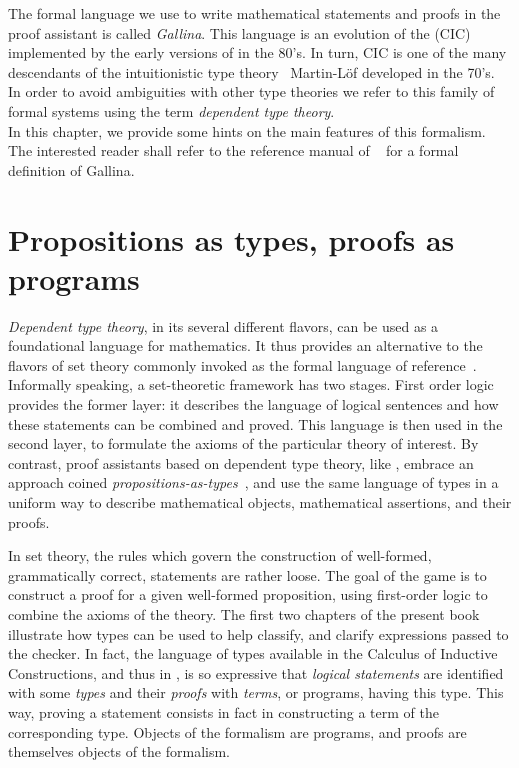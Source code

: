 The formal language we use to write
mathematical statements and proofs in the \Coq{} proof assistant
is called \emph{Gallina}.
This language is an evolution of the \emph{\mcbCIC{}}
(CIC)~\cite{coquand:huet:88,CoPa89} implemented
by the early versions of \Coq{} in the 80's. In turn, CIC is one of the many
descendants of the intuitionistic type theory~\cite{ITT} Martin-Löf developed in
the 70's. In order to avoid ambiguities with other type theories we refer to
this family of formal systems using the term \emph{dependent type theory}.\\
In this
chapter, we provide some hints on the main features of this
formalism. The interested reader shall refer to the reference manual
of \Coq{}~\cite{Coq:manual} for a formal definition of Gallina. %


\section{Propositions as types, proofs as programs}\label{sec:patpap}
\emph{Dependent type theory}, in its several different flavors, can be used
as a foundational language for mathematics. It thus provides an alternative
to the flavors of set theory commonly invoked as the formal language of
reference~\cite{bourbaki-sets}. Informally speaking, a
set-theoretic framework has two stages. First order logic provides
the former layer: it describes the language of logical sentences and how
these statements can be combined and proved. This language is then
used in the second layer, to formulate the axioms of the particular
theory of interest. By contrast, proof assistants based on dependent
type theory, like \Coq{}, embrace an approach coined
\emph{propositions-as-types}~\cite{ch}, and use the same language of
types in a uniform way to describe mathematical objects, mathematical
assertions, and their proofs. 

In set theory, the rules which govern the construction of
well-formed, grammatically correct, statements are rather loose.
The goal of the game is to construct a proof for a given well-formed
proposition, using first-order logic to combine the axioms of the
theory. The first two chapters of the present book illustrate how
types can be used to help classify, and clarify expressions passed to
the checker. In fact, the language of types available in the Calculus
of Inductive Constructions, and thus in  \Coq{}, is so expressive that
\emph{logical statements} are identified with some \emph{types} and
their \emph{proofs} with \emph{terms}, or programs, having this
type. This way, proving a statement consists in fact in constructing a
term of the corresponding type. Objects of the formalism are programs,
and proofs are themselves objects of the formalism.

